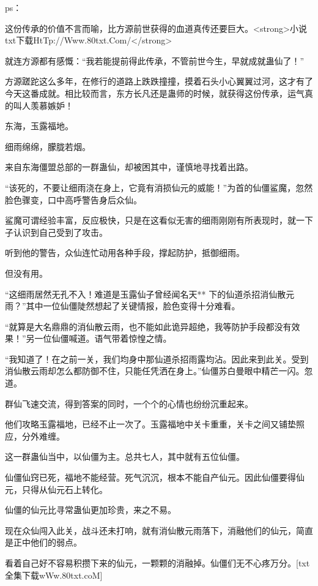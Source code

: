 
\begin{this_body}

ps：

这份传承的价值不言而喻，比方源前世获得的血道真传还要巨大。<strong>小说txt下载HtTp://Www.80txt.Com/</strong>

就连方源都有感慨：“我若能提前得此传承，不管前世今生，早就成就蛊仙了！”

方源蹉跎这么多年，在修行的道路上跌跌撞撞，摸着石头小心翼翼过河，这才有了今天这番成就。相比较而言，东方长凡还是蛊师的时候，就获得这份传承，运气真的叫人羡慕嫉妒！

东海，玉露福地。

细雨绵绵，朦胧若烟。

来自东海僵盟总部的一群蛊仙，却被困其中，谨慎地寻找着出路。

“该死的，不要让细雨浇在身上，它竟有消损仙元的威能！”为首的仙僵鲨魔，忽然脸色骤变，口中高呼警告身后众仙。

鲨魔可谓经验丰富，反应极快，只是在这看似无害的细雨刚刚有所表现时，就一下子认识到自己受到了攻击。

听到他的警告，众仙连忙动用各种手段，撑起防护，抵御细雨。

但没有用。

“这细雨居然无孔不入！难道是玉露仙子曾经闻名天** 下的仙道杀招消仙散元雨？”其中一位仙僵陡然想起了关键情报，脸色变得十分难看。

“就算是大名鼎鼎的消仙散云雨，也不能如此诡异超绝，我等防护手段都没有效果！”另一位仙僵喊道。语气带着惊惶之情。

“我知道了！在之前一关，我们均身中那仙道杀招雨露均沾。因此来到此关。受到消仙散云雨却怎么都防御不住，只能任凭洒在身上。”仙僵苏白曼眼中精芒一闪。忽道。

群仙飞速交流，得到答案的同时，一个个的心情也纷纷沉重起来。

他们攻略玉露福地，已经不止一次了。玉露福地中关卡重重，关卡之间又铺垫照应，分外难缠。

这一群蛊仙当中，以仙僵为主。总共七人，其中就有五位仙僵。

仙僵仙窍已死，福地不能经营。死气沉沉，根本不能自产仙元。因此仙僵要得仙元，只得从仙元石上转化。

仙僵的仙元比寻常蛊仙更加珍贵，来之不易。

现在众仙闯入此关，战斗还未打响，就有消仙散元雨落下，消融他们的仙元，简直是正中他们的弱点。

看着自己好不容易积攒下来的仙元，一颗颗的消融掉。仙僵们无不心疼万分。[txt全集下载wWw.80txt.coM]


\end{this_body}
